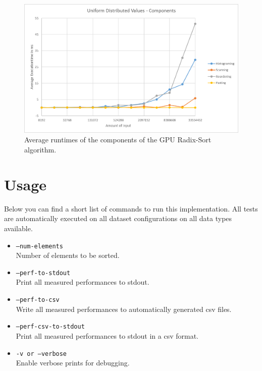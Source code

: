 \documentclass{llncs}
\begin{document}
\begin{figure}
  \begin{center}
    \includegraphics[width=\columnwidth]{charts/uniform_details.png}
  \end{center}
  \caption{Average runtimes of the components of the GPU Radix-Sort algorithm.}\label{fig:components}
\end{figure}

\section{Usage}
Below you can find a short list of commands to run this implementation. All tests are automatically executed on all dataset configurations on all data types available.

\begin{itemize}
  \item[] \texttt{--num-elements}\\ Number of elements to be sorted.
  \item[] \texttt{--perf-to-stdout}\\ Print all measured performances to stdout.
  \item[] \texttt{--perf-to-csv}\\ Write all measured performances to automatically generated csv files.
  \item[] \texttt{--perf-csv-to-stdout}\\ Print all measured performances to stdout in a csv format.
  \item[] \texttt{-v or --verbose}\\ Enable verbose prints for debugging.
\end{itemize}



\end{document}
